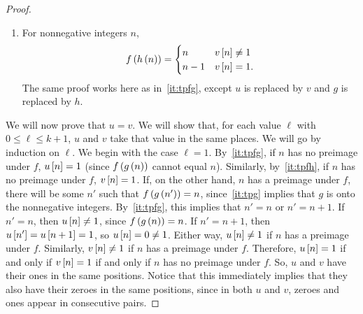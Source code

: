 \documentclass[english,12pt]{article}
\begin{document}
\begin{proof}
\begin{enumerate}
\[
f\p{g\p{n}}=\begin{cases}
n & u\bk{n}\neq1\\
n-1 & u\bk{n}=1.
\end{cases}
\]
We will prove this by induction on $n$.  If $n=0$, then $g\p{n}=0$, and $f\p{g\p{n}}=0$, as required.  Now, assume that this holds for smaller values of $n$.  If $u\bk{n}=1$, then
\begin{align*}
f\p{g\p{n}}&=f\p{g\p{n-1}}\\
&=n-1,
\end{align*}
as required.  If $u\bk{n-1}=1$, then
\begin{align*}
f\p{g\p{n}}&=f\p{g\p{n-1}+1}\\
&=f\p{g\p{n-1}}+1\\
&=n-2+2\\
&=n,
\end{align*}
(since $w\bk{g\p{n-1}}=0$) as required.  If $u\bk{n}\neq1$ and $u\bk{n-1}\neq1$, then
\begin{align*}
f\p{g\p{n}}&=f\p{g\p{n-1}+1}\\
&=f\p{g\p{n-1}}+1\\
&=n-1+1\\
&=n,
\end{align*}
(since $w\bk{g\p{n-1}}\neq0$) as required.
\item\label{it:tpfh} For nonnegative integers $n$,
\[
f\left(h\left(n\right)\right)=\begin{cases}
n & v\left[n\right]\neq1\\
n-1 & v\left[n\right]=1.
\end{cases}
\]
The same proof works here as in~\ref{it:tpfg}, except $u$ is replaced by $v$ and $g$ is replaced by $h$.
\end{enumerate}
We will now prove that $u=v$.  We will show that, for each value $\ell$ with $0\leq\ell\leq k+1$, $u$ and $v$ take that value in the same places.  We will go by induction on $\ell$.  We begin with the case $\ell=1$.  By~\ref{it:tpfg}, if $n$ has no preimage under $f$, $u\bk{n}=1$ (since $f\left(g\left(n\right)\right)$ cannot equal $n$).  Similarly, by~\ref{it:tpfh}, if $n$ has no preimage under $f$, $v\left[n\right]=1$.  If, on the other hand, $n$ has a preimage under $f$, there will be some $n'$ such that $f\left(g\left(n'\right)\right)=n$, since~\ref{it:tpg} implies that $g$ is onto the nonnegative integers.  By~\ref{it:tpfg}, this implies that $n'=n$ or $n'=n+1$.  If $n'=n$, then $u\bk{n}\neq1$, since $f\left(g\left(n\right)\right)=n$.  If $n'=n+1$, then $u\left[n'\right]=u\left[n+1\right]=1$, so $u\left[n\right]=0\neq1$.  Either way, $u\bk{n}\neq1$ if $n$ has a preimage under $f$.  Similarly, $v\left[n\right]\neq1$ if $n$ has a preimage under $f$.  Therefore, $u\bk{n}=1$ if and only if $v\left[n\right]=1$ if and only if $n$ has no preimage under $f$.  So, $u$ and $v$ have their ones in the same positions.  Notice that this immediately implies that they also have their zeroes in the same positions, since in both $u$ and $v$, zeroes and ones appear in consecutive pairs.


\end{proof}
\end{document}
